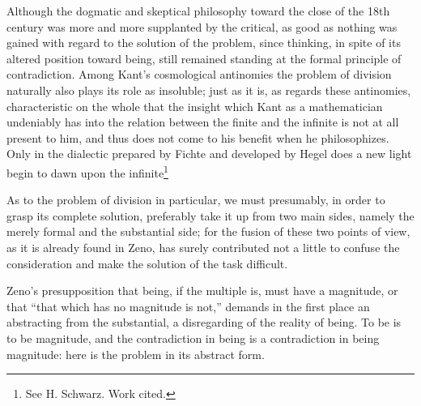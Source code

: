 \documentclass[12pt,a4paper,openany]{book}
\newcommand{\opage}[1]{\marginnote{\footnotesize\textit{[#1]}}}
\begin{document}
Although the dogmatic and skeptical philosophy toward
the close of the 18th century was more and more supplanted
by the critical, as good as nothing was gained with regard to the solution
of the problem, since thinking, in spite of its
altered position toward being, still remained standing at the
\setcounter{footnote}{0}%
\opage{121}formal principle of contradiction. Among Kant's cosmological
antinomies the problem of division naturally also plays its
role as insoluble; just as it is, as regards these antinomies,
characteristic on the whole that the insight which Kant
as a mathematician undeniably has into the relation between the
finite and the infinite is not at all present to him,
and thus does not come to his benefit when he philosophizes.
Only in the dialectic prepared by Fichte and developed by Hegel
does a new light begin to dawn upon the infinite\footnote[1]{See H. Schwarz. Work cited.}

As to the problem of division in particular, we must
presumably, in order to grasp its complete solution, preferably take it up from
two main sides, namely the merely formal and the substantial
side; for the fusion of these two points of view,
as it is already found in Zeno, has surely
contributed not a little to confuse the consideration and make the solution
of the task difficult.

Zeno's presupposition that being, if the
multiple is, must have a magnitude, or that ``that which has
no magnitude is not,'' demands in the first place
an abstracting from the substantial, a disregarding of the reality of
being. To be is to be magnitude, and
the contradiction in being is a contradiction in
being magnitude: here is the problem in its abstract form.
\end{document}
